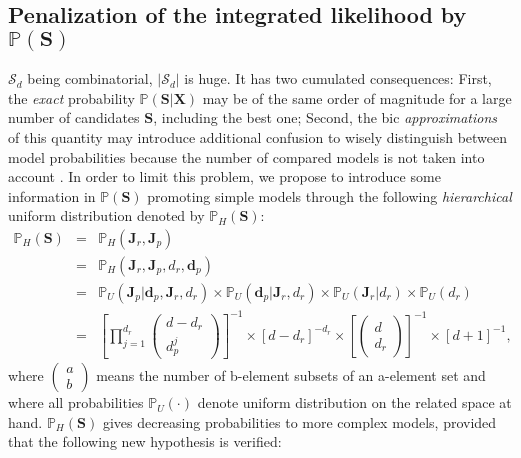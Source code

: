 \documentclass[12pt,a4paper]{report}
\begin{document}
		\subsection{Penalization of the integrated likelihood by $\mathbb{P}(\boldsymbol{S})$} \label{compstruct}
		
	$\mathcal{S}_d$ being combinatorial, $|\mathcal{S}_d|$ is huge. It has two cumulated consequences: First, the {\it exact} probability $\mathbb{P}(\boldsymbol{S}|\boldsymbol{X})$ may be of the same order of magnitude for a large number of candidates  $\boldsymbol{S}$, including the best one; Second, the {\sc bic} {\it approximations} of this quantity may introduce additional confusion to wisely distinguish between model probabilities because the number of compared models is not taken into account \cite{massart2007concentration}. In order to limit this problem, we propose to introduce some information in $\mathbb{P}(\boldsymbol{S})$ promoting simple models through the following {\it hierarchical} uniform distribution denoted by $\mathbb{P}_H(\boldsymbol{S})$:
\begin{eqnarray}
\mathbb{P}_H(\boldsymbol{S}) & = & \mathbb{P}_H(\boldsymbol{J}_r,\boldsymbol{J}_p) \\
 & = & \mathbb{P}_H(\boldsymbol{J}_r,\boldsymbol{J}_p,d_r,\boldsymbol{d}_p) \\
 & = & \mathbb{P}_U(\boldsymbol{J}_p|\boldsymbol{d}_p,\boldsymbol{J}_r,d_r) \times \mathbb{P}_U(\boldsymbol{d}_p|\boldsymbol{J}_r,d_r) \times \mathbb{P}_U(\boldsymbol{J}_r|d_r)\times \mathbb{P}_U(d_r) \\
 & = & \left[\prod_{j=1}^{d_r} \left(\begin{array}{c} d-d_r \\ d_p^j \end{array}\right) \right]^{-1} \times \left[d-d_r\right]^{-d_r} \times \left[\left(\begin{array}{c} d \\ d_r \end{array} \right)\right]^{-1} \times [d+1]^{-1},
\end{eqnarray}
where $\left(\begin{array}{c} a \\ b \end{array}\right)$ means the number of b-element subsets of an a-element set and where all probabilities $\mathbb{P}_U(\cdot)$ denote uniform distribution on the related space at hand. $\mathbb{P}_H(\boldsymbol{S})$ gives decreasing probabilities to more complex models, provided that the following new hypothesis is verified:
\end{document}
